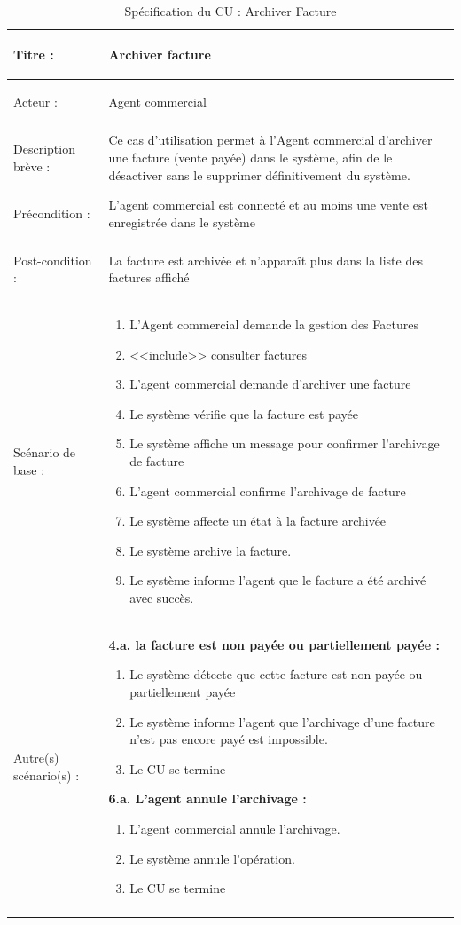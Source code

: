 \begin{longtable}{|>{\bfseries\raggedright\arraybackslash}p{3.5cm}|p{\dimexpr\textwidth-3.5cm-4\tabcolsep-2\arrayrulewidth}|}
\hline
Titre : & Archiver facture \\
\hline
Acteur : & Agent commercial \\
\hline
Description brève : & Ce cas d'utilisation permet à l'Agent commercial d'archiver une facture (vente payée) dans le système, afin de le désactiver sans le supprimer définitivement du système. \\
\hline
Précondition : & L'agent commercial est connecté et au moins une vente est enregistrée dans le système \\
\hline
Post-condition : & La facture est archivée et n'apparaît plus dans la liste des factures affiché \\
\hline
Scénario de base : &
\begin{enumerate}[leftmargin=1.5em, topsep=2pt, itemsep=1pt]
  \item L'Agent commercial demande la gestion des Factures
  \item <<include>> consulter factures
  \item L'agent commercial demande d'archiver une facture
  \item Le système vérifie que la facture est payée
  \item Le système affiche un message pour confirmer l'archivage de facture
  \item L'agent commercial confirme l'archivage de facture
  \item Le système affecte un état à la facture archivée
  \item Le système archive la facture.
  \item Le système informe l'agent que le facture a été archivé avec succès.

\end{enumerate} \\
\hline
Autre(s) scénario(s) : &
\textbf{4.a. la facture est non payée ou partiellement payée :}
\begin{enumerate}[leftmargin=1.5em, topsep=2pt, itemsep=1pt]
  \item Le système détecte que cette facture est non payée ou partiellement payée
  \item Le système informe l'agent que l'archivage d'une facture n'est pas encore payé est impossible.
  \item Le CU se termine
\end{enumerate}
\textbf{6.a. L'agent annule l'archivage :}
\begin{enumerate}[leftmargin=1.5em, topsep=2pt, itemsep=1pt]
  \item L'agent commercial annule l'archivage.
  \item Le système annule l'opération.
  \item Le CU se termine
\end{enumerate} \\
\hline
\caption{Spécification du CU : Archiver Facture}
\label{tab:cu-archiver-facture}
\end{longtable}

